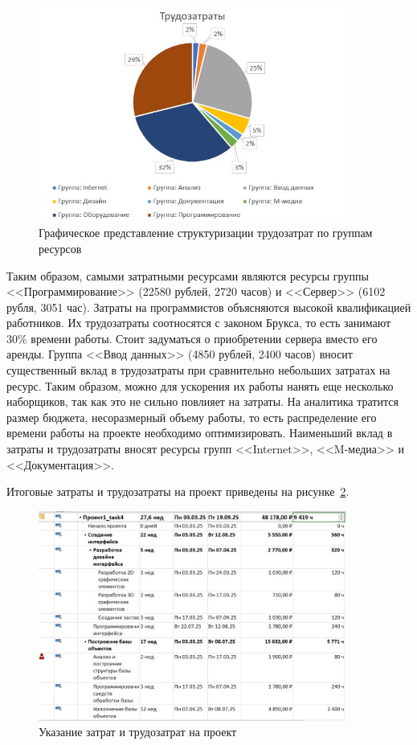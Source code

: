 \begin{figure}[H]
	\centering
	\includegraphics[width=0.9\textwidth]{img/task3/work_diagram.jpg}
	\caption{Графическое представление структуризации трудозатрат по группам ресурсов}
	\label{fig:work_diagram}
\end{figure}

Таким образом, самыми затратными ресурсами являются ресурсы группы <<Программирование>> (22580 рублей, 2720 часов) и <<Сервер>> (6102 рубля, 3051 час).
Затраты на программистов объясняются высокой квалификацией работников.
Их трудозатраты соотносятся с законом Брукса, то есть занимают 30\% времени работы.
Стоит задуматься о приобретении сервера вместо его аренды.
Группа <<Ввод данных>> (4850 рублей, 2400 часов) вносит существенный вклад в трудозатраты при сравнительно небольших затратах на ресурс.
Таким образом, можно для ускорения их работы нанять еще несколько наборщиков, так как это не сильно повлияет на затраты.
На аналитика тратится размер бюджета, несоразмерный объему работы, то есть распределение его времени работы на проекте необходимо оптимизировать.
Наименьший вклад в затраты и трудозатраты вносят ресурсы групп <<Internet>>, <<M-медиа>> и <<Документация>>.

Итоговые затраты и трудозатраты на проект приведены на рисунке~\ref{fig:final}.
\begin{figure}[H]
	\centering
	\includegraphics[width=0.9\textwidth]{img/task3/final.jpg}
	\caption{Указание затрат и трудозатрат на проект}
	\label{fig:final}
\end{figure}

